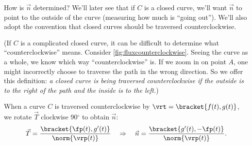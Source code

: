 %

How is $\vec n$ determined? We'll later see that if $C$ is a closed curve, we'll want $\vec n$ to point to the outside of the curve (measuring how much is ``going out''). We'll also adopt the convention that closed curves should be traversed counterclockwise. 


(If $C$ is a complicated closed curve, it can be difficult to determine what ``counterclockwise'' means. Consider \autoref{fig:fluxcounterclockwise}. Seeing the curve as a whole, we know which way ``counterclockwise'' is. If we zoom in on point $A$, one might incorrectly choose to traverse the path in the wrong direction. So we offer this definition: \emph{a closed curve is being traversed counterclockwise if the outside is to the right of the path and the inside is to the left.})

When a curve $C$ is traversed counterclockwise by $\vrt =\bracket{f(t), g(t)}$, we rotate $\vec T$ clockwise 90$^\circ$  to obtain $\vec n$:
\[
\vec T = \frac{\bracket{\fp(t),g'(t)}}{\norm{\vrp(t)}} \quad \Rightarrow \quad \vec n = \frac{\bracket{g'(t),-\fp(t)}}{\norm{\vrp(t)}}.
\]

